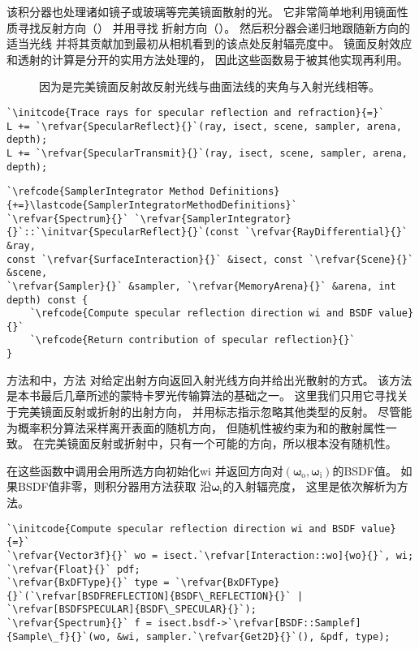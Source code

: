 该积分器也处理诸如镜子或玻璃等完美镜面散射的光。
它非常简单地利用镜面性质寻找反射方向（）
并用寻找
折射方向（）。
然后积分器会递归地跟随新方向的适当光线
并将其贡献加到最初从相机看到的该点处反射辐亮度中。
镜面反射效应和透射的计算是分开的实用方法处理的，
因此这些函数易于被其他实现再利用。
\begin{figure}[htbp]
    \centering
    \caption{因为是完美镜面反射故反射光线与曲面法线的夹角与入射光线相等。}
    \label{fig:1.21}
\end{figure}
\begin{lstlisting}
`\initcode{Trace rays for specular reflection and refraction}{=}`
L += `\refvar{SpecularReflect}{}`(ray, isect, scene, sampler, arena, depth);
L += `\refvar{SpecularTransmit}{}`(ray, isect, scene, sampler, arena, depth);
\end{lstlisting}
\begin{lstlisting}
`\refcode{SamplerIntegrator Method Definitions}{+=}\lastcode{SamplerIntegratorMethodDefinitions}`
`\refvar{Spectrum}{}` `\refvar{SamplerIntegrator}{}`::`\initvar{SpecularReflect}{}`(const `\refvar{RayDifferential}{}` &ray,
const `\refvar{SurfaceInteraction}{}` &isect, const `\refvar{Scene}{}` &scene,
`\refvar{Sampler}{}` &sampler, `\refvar{MemoryArena}{}` &arena, int depth) const {
    `\refcode{Compute specular reflection direction wi and BSDF value}{}`
    `\refcode{Return contribution of specular reflection}{}`
}
\end{lstlisting}

方法和中，方法
对给定出射方向返回入射光线方向并给出光散射的方式。
该方法是本书最后几章所述的蒙特卡罗光传输算法的基础之一。
这里我们只用它寻找关于完美镜面反射或折射的出射方向，
并用标志指示忽略其他类型的反射。
尽管能
为概率积分算法采样离开表面的随机方向，
但随机性被约束为和的散射属性一致。
在完美镜面反射或折射中，只有一个可能的方向，所以根本没有随机性。

在这些函数中调用会用所选方向初始化{\ttfamily wi}
并返回方向对$({\bm \omega}_\mathrm{o},{\bm \omega}_\mathrm{i})$的BSDF值。
如果BSDF值非零，则积分器用方法获取
沿${\bm \omega}_\mathrm{i}$的入射辐亮度，
这里是依次解析为方法。
\begin{lstlisting}
`\initcode{Compute specular reflection direction wi and BSDF value}{=}`
`\refvar{Vector3f}{}` wo = isect.`\refvar[Interaction::wo]{wo}{}`, wi;
`\refvar{Float}{}` pdf;
`\refvar{BxDFType}{}` type = `\refvar{BxDFType}{}`(`\refvar[BSDFREFLECTION]{BSDF\_REFLECTION}{}` | `\refvar[BSDFSPECULAR]{BSDF\_SPECULAR}{}`);
`\refvar{Spectrum}{}` f = isect.bsdf->`\refvar[BSDF::Samplef]{Sample\_f}{}`(wo, &wi, sampler.`\refvar{Get2D}{}`(), &pdf, type);
\end{lstlisting}

